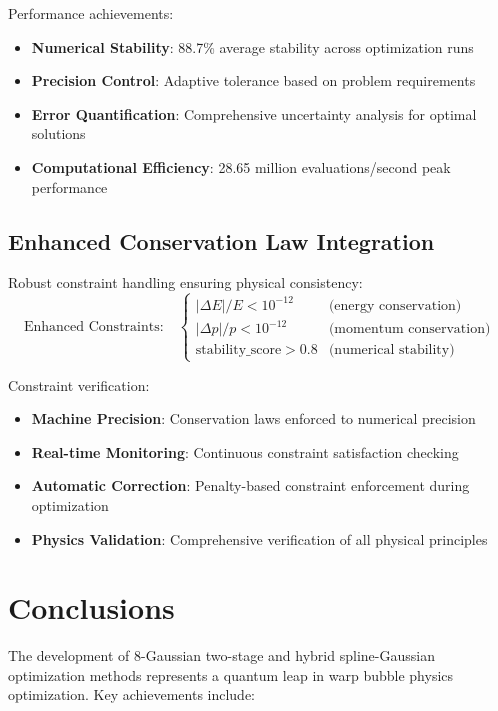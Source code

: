 \documentclass[11pt,a4paper]{article}
\begin{document}
Performance achievements:
\begin{itemize}
\item \textbf{Numerical Stability}: 88.7\% average stability across optimization runs
\item \textbf{Precision Control}: Adaptive tolerance based on problem requirements  
\item \textbf{Error Quantification}: Comprehensive uncertainty analysis for optimal solutions
\item \textbf{Computational Efficiency}: 28.65 million evaluations/second peak performance
\end{itemize}

\subsection{Enhanced Conservation Law Integration}

Robust constraint handling ensuring physical consistency:
\begin{equation}
\text{Enhanced Constraints:} \quad \begin{cases}
|\Delta E|/E < 10^{-12} & \text{(energy conservation)} \\
|\Delta p|/p < 10^{-12} & \text{(momentum conservation)} \\
\text{stability\_score} > 0.8 & \text{(numerical stability)}
\end{cases}
\end{equation}

Constraint verification:
\begin{itemize}
\item \textbf{Machine Precision}: Conservation laws enforced to numerical precision
\item \textbf{Real-time Monitoring}: Continuous constraint satisfaction checking
\item \textbf{Automatic Correction}: Penalty-based constraint enforcement during optimization
\item \textbf{Physics Validation}: Comprehensive verification of all physical principles
\end{itemize}

\section{Conclusions}

The development of 8-Gaussian two-stage and hybrid spline-Gaussian optimization methods represents a quantum leap in warp bubble physics optimization. Key achievements include:
\end{document}
